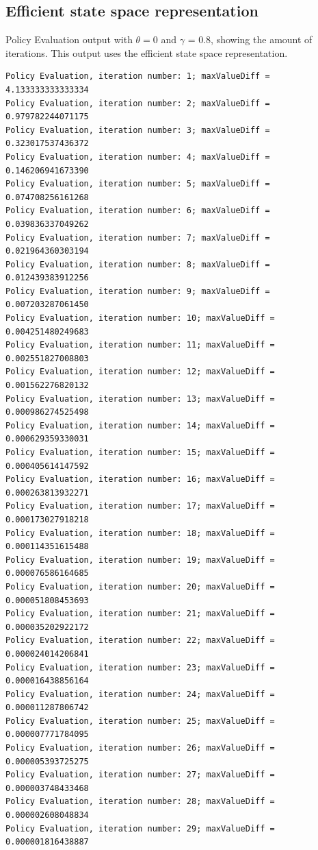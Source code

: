 \documentclass{article}
\begin{document}
\subsection{Efficient state space representation}
Policy Evaluation output with $\theta=0$ and $\gamma$ = 0.8, showing the amount of iterations. This output uses the efficient state space representation.
\begin{scriptsize}
\begin{verbatim}
Policy Evaluation, iteration number: 1; maxValueDiff = 4.133333333333334 
Policy Evaluation, iteration number: 2; maxValueDiff = 0.979782244071175 
Policy Evaluation, iteration number: 3; maxValueDiff = 0.323017537436372 
Policy Evaluation, iteration number: 4; maxValueDiff = 0.146206941673390 
Policy Evaluation, iteration number: 5; maxValueDiff = 0.074708256161268 
Policy Evaluation, iteration number: 6; maxValueDiff = 0.039836337049262 
Policy Evaluation, iteration number: 7; maxValueDiff = 0.021964360303194 
Policy Evaluation, iteration number: 8; maxValueDiff = 0.012439383912256 
Policy Evaluation, iteration number: 9; maxValueDiff = 0.007203287061450 
Policy Evaluation, iteration number: 10; maxValueDiff = 0.004251480249683 
Policy Evaluation, iteration number: 11; maxValueDiff = 0.002551827008803 
Policy Evaluation, iteration number: 12; maxValueDiff = 0.001562276820132 
Policy Evaluation, iteration number: 13; maxValueDiff = 0.000986274525498 
Policy Evaluation, iteration number: 14; maxValueDiff = 0.000629359330031 
Policy Evaluation, iteration number: 15; maxValueDiff = 0.000405614147592 
Policy Evaluation, iteration number: 16; maxValueDiff = 0.000263813932271 
Policy Evaluation, iteration number: 17; maxValueDiff = 0.000173027918218 
Policy Evaluation, iteration number: 18; maxValueDiff = 0.000114351615488 
Policy Evaluation, iteration number: 19; maxValueDiff = 0.000076586164685 
Policy Evaluation, iteration number: 20; maxValueDiff = 0.000051808453693 
Policy Evaluation, iteration number: 21; maxValueDiff = 0.000035202922172 
Policy Evaluation, iteration number: 22; maxValueDiff = 0.000024014206841 
Policy Evaluation, iteration number: 23; maxValueDiff = 0.000016438856164 
Policy Evaluation, iteration number: 24; maxValueDiff = 0.000011287806742 
Policy Evaluation, iteration number: 25; maxValueDiff = 0.000007771784095 
Policy Evaluation, iteration number: 26; maxValueDiff = 0.000005393725275 
Policy Evaluation, iteration number: 27; maxValueDiff = 0.000003748433468 
Policy Evaluation, iteration number: 28; maxValueDiff = 0.000002608048834 
Policy Evaluation, iteration number: 29; maxValueDiff = 0.000001816438887 

\end{verbatim}
\end{scriptsize}
\end{document}
